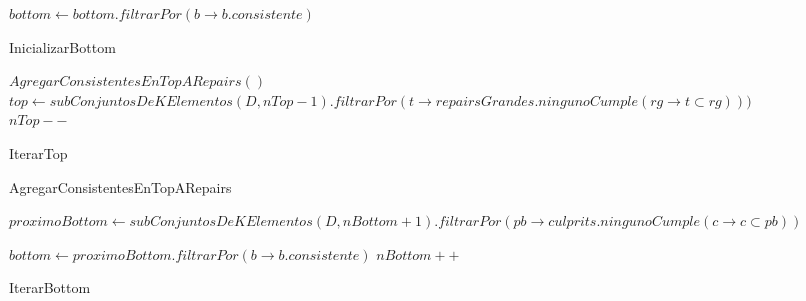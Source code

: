 \documentclass[11pt,a4paper,twoside]{tesis}
\begin{document}
\begin{figure}
\begin{algorithm}[H]
\SetAlgoLined

$bottom \gets bottom.filtrarPor(b \rightarrow b.consistente )$

 \caption{InicializarBottom}
\end{algorithm}



\begin{algorithm}[H]
\SetAlgoLined
$AgregarConsistentesEnTopARepairs()$\;
$top \gets subConjuntosDeKElementos(D, nTop - 1).filtrarPor(t \rightarrow repairsGrandes.ningunoCumple(rg \rightarrow t \subset rg) ))$\;	
$nTop--$\;		
\caption{IterarTop}
 
 
\end{algorithm}
\end{figure}
\begin{figure}
\begin{algorithm}[H]
\SetAlgoLined
{}
\caption{AgregarConsistentesEnTopARepairs}
 
 
\end{algorithm}

\begin{algorithm}[H]
\SetAlgoLined


 $proximoBottom \gets subConjuntosDeKElementos(D, nBottom + 1).filtrarPor(pb \rightarrow culprits.ningunoCumple(c \rightarrow c \subset pb))$\;

$bottom \gets proximoBottom.filtrarPor(b \rightarrow b.consistente)$\;
$nBottom++$\;
 \caption{IterarBottom}

\end{algorithm}
\end{figure}
\end{document}
